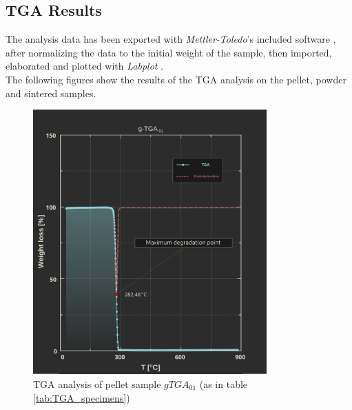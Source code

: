 \documentclass{article}
\begin{document}
        \subsection{TGA Results\label{TGA_Results}}
        The analysis data has been exported with \textit{Mettler-Toledo}'s included software \autocites{Mettler_Toledo}, after normalizing the data to the initial weight of the sample,
        then imported, elaborated and plotted with \textit{Labplot} \autocites{Labplot}. \\
        The following figures show the results of the TGA analysis on the pellet, powder and sintered samples. \\ 
        \begin{figure}[h!]
            \centering
            \includegraphics[width=0.8\textwidth]{Pictures/Thermal_analysis_plots/TGA_catalogued/Fixed/g-TGA01.pdf}
            \caption{TGA analysis of pellet sample $gTGA_{01}$ (as in table \ref{tab:TGA_specimens})}
            \label{fig:TGA_01}
        \end{figure}
\end{document}
